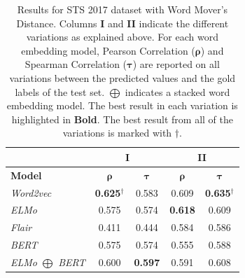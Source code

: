 \begin{enumerate}
\begin{table}[htb]
{\begin{tabular}{|l|cc|cc|}
			\hline & 
			\multicolumn{2}{c|}{\textbf{I}}    & \multicolumn{2}{c|}{\textbf{II}}   \\ 
			\hline
			\multicolumn{1}{|l|}{\textbf{Model}} 
			&  $\bm{\rho}$   & $\bm{\tau}$      
			&  $\bm{\rho}$   & $\bm{\tau}$   
			\\ \hline
			\textit{Word2vec}                     
			& \textbf{0.625}$^{\dagger}$ & 0.583         
			& 0.609             & \textbf{0.635}$^{\dagger}$  \\
			\textit{ELMo}                     
			& 0.575                      & 0.574         
			& \textbf{0.618}             & 0.609 \\
			\textit{Flair}                     
			& 0.411                      & 0.444         
			& 0.584                      & 0.586\\
			\textit{BERT}                     
			& 0.575                      & 0.574         
			& 0.555                      & 0.588 \\
			\textit{ELMo $\bigoplus$ BERT}                     
			& 0.600                      & \textbf{0.597}  & 0.591                      & 0.608  \\
			\hline
		\end{tabular}
	}
	\caption[Results for STS 2017 with Word Mover's Distance]{Results for STS 2017 dataset with Word Mover's Distance. Columns \textbf{I} and \textbf{II} indicate the different variations as explained above. For each word embedding model, Pearson Correlation ($\bm{\rho}$) and Spearman Correlation ($\bm{\tau}$) are reported on all variations between the predicted values and the gold labels of the test set. $\bigoplus$ indicates a stacked word embedding model. The best result in each variation is highlighted in \textbf{Bold}. The best result from all of the variations is marked with ${\dagger}$. }  
	\label{tab:sts_word_movers}
\end{table}

\begin{table}[htb]
	\centering
\end{table}
\end{enumerate}
